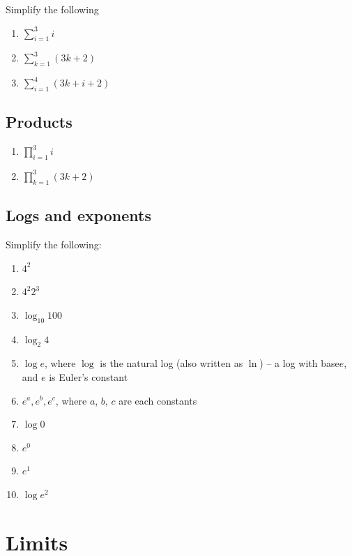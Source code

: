 \documentclass[
  letterpaper,
]{book}
\providecommand{\tightlist}{%
  \setlength{\itemsep}{0pt}\setlength{\parskip}{0pt}}\usepackage{longtable,booktabs,array}
\theoremstyle{definition}
\theoremstyle{definition}
\theoremstyle{plain}
\theoremstyle{definition}
\theoremstyle{plain}
\theoremstyle{plain}
\theoremstyle{remark}
\begin{document}
Simplify the following

\begin{enumerate}
\def\labelenumi{\arabic{enumi}.}
\tightlist
\item
  \(\sum\limits_{i = 1}^3 i\)
\item
  \(\sum\limits_{k = 1}^3(3k + 2)\)
\item
  \(\sum\limits_{i= 1}^4 (3k + i + 2)\)
\end{enumerate}

\hypertarget{products}{%
\subsection*{Products}\label{products}}

\begin{enumerate}
\def\labelenumi{\arabic{enumi}.}
\tightlist
\item
  \(\prod\limits_{i= 1}^3 i\)
\item
  \(\prod\limits_{k=1}^3(3k + 2)\)
\end{enumerate}

\hypertarget{logs-and-exponents}{%
\subsection*{Logs and exponents}\label{logs-and-exponents}}

Simplify the following:

\begin{enumerate}
\def\labelenumi{\arabic{enumi}.}
\tightlist
\item
  \(4^2\)
\item
  \(4^2 2^3\)
\item
  \(\log_{10}100\)
\item
  \(\log_{2}4\)
\item
  \(\log e\), where \(\log\) is the natural log (also written as
  \(\ln\)) -- a log with base\(e\), and \(e\) is Euler's constant
\item
  \(e^a, e^b, e^c\), where \(a\), \(b\), \(c\) are each constants
\item
  \(\log 0\)
\item
  \(e^0\)
\item
  \(e^1\)
\item
  \(\log e^2\)
\end{enumerate}

\hypertarget{limits}{%
\section*{Limits}\label{limits}}
\end{document}
